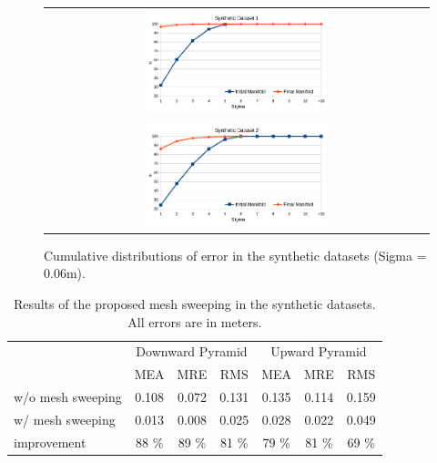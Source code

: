 \begin{figure}[t]
\setlength{\tabcolsep}{1px}
\centering
\begin{tabular}{c}
\includegraphics[width=0.48\textwidth]{./img/histSim1}\\
\includegraphics[width=0.48\textwidth]{./img/histSim2}\\
\end{tabular}
\caption{Cumulative distributions of error in the synthetic datasets (Sigma = 0.06m).}
\label{fig:simulatedhist2}
\end{figure}

\begin{table}[t]
\caption{Results of the proposed mesh sweeping in the synthetic datasets. All errors are in meters.}
\label{tab:resSim}
\scriptsize
\centering
\begin{tabular}{lcccccc}
\toprule 
&\multicolumn{3}{c}{Downward Pyramid}&\multicolumn{3}{c}{Upward Pyramid}\\
              & MEA & MRE & RMS  &  MEA& MRE & RMS  \\
\midrule
w/o mesh sweeping  & 0.108 & 0.072 & 0.131 &  0.135 & 0.114 & 0.159 \\
w/ mesh sweeping    & 0.013 & 0.008 & 0.025 &  0.028 & 0.022 & 0.049 \\
improvement   & 88 \% & 89 \% & 81 \% &  79 \% & 81 \% & 69 \% \\
\end{tabular}
\end{table}


